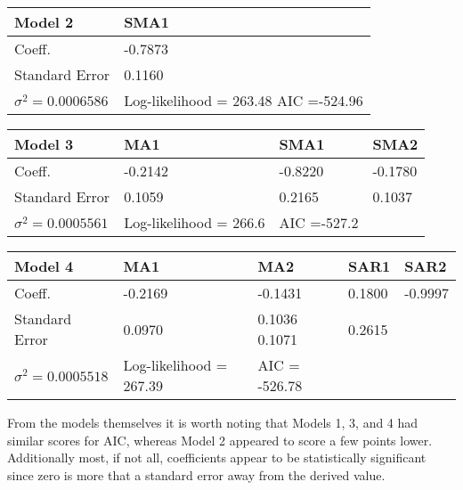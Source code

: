 \documentclass[
]{article}
\begin{document}
\begin{longtable}[]{@{}ll@{}}
\toprule
Model 2 & SMA1\tabularnewline
\midrule
\endhead
Coeff. & -0.7873\tabularnewline
Standard Error & 0.1160\tabularnewline
\(\sigma^2 = 0.0006586\) & Log-likelihood = 263.48 AIC
=-524.96\tabularnewline
\bottomrule
\end{longtable}

\begin{longtable}[]{@{}llll@{}}
\toprule
Model 3 & MA1 & SMA1 & SMA2\tabularnewline
\midrule
\endhead
Coeff. & -0.2142 & -0.8220 & -0.1780\tabularnewline
Standard Error & 0.1059 & 0.2165 & 0.1037\tabularnewline
\(\sigma^2 = 0.0005561\) & Log-likelihood = 266.6 & AIC =-527.2
&\tabularnewline
\bottomrule
\end{longtable}

\begin{longtable}[]{@{}lllll@{}}
\toprule
Model 4 & MA1 & MA2 & SAR1 & SAR2\tabularnewline
\midrule
\endhead
Coeff. & -0.2169 & -0.1431 & 0.1800 & -0.9997\tabularnewline
Standard Error & 0.0970 & 0.1036 0.1071 & 0.2615 &\tabularnewline
\(\sigma^2 = 0.0005518\) & Log-likelihood = 267.39 & AIC = -526.78 &
&\tabularnewline
\bottomrule
\end{longtable}

From the models themselves it is worth noting that Models 1, 3, and 4
had similar scores for AIC, whereas Model 2 appeared to score a few
points lower. Additionally most, if not all, coefficients appear to be
statistically significant since zero is more that a standard error away
from the derived value.
\end{document}
